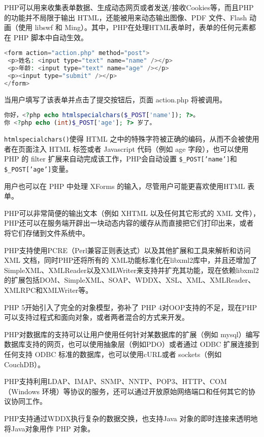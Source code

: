 PHP可以用来收集表单数据、生成动态网页或者发送/接收Cookies等，而且PHP的功能并不局限于输出 HTML，还能被用来动态输出图像、PDF 文件、Flash 动画（使用 libswf 和 Ming）。其中，PHP在处理HTML表单时，表单的任何元素都在 PHP 脚本中自动生效。

\begin{lstlisting}[language=PHP]
<form action="action.php" method="post">
 <p>姓名: <input type="text" name="name" /></p>
 <p>年龄: <input type="text" name="age" /></p>
 <p><input type="submit" /></p>
</form>
\end{lstlisting}

当用户填写了该表单并点击了提交按钮后，页面 action.php 将被调用。


\begin{lstlisting}[language=PHP]
你好，<?php echo htmlspecialchars($_POST['name']); ?>。
你 <?php echo (int)$_POST['age']; ?> 岁了。
\end{lstlisting}

\texttt{htmlspecialchars()}使得 HTML 之中的特殊字符被正确的编码，从而不会被使用者在页面注入 HTML 标签或者 Javascript 代码（例如 age 字段），也可以使用 PHP 的 filter 扩展来自动完成该工作，PHP会自动设置 \texttt{\$\_POST['name']}和\texttt{\$\_POST['age']}变量。

用户也可以在 PHP 中处理 XForms 的输入，尽管用户可能更喜欢使用HTML 表单。

PHP可以非常简便的输出文本（例如 XHTML 以及任何其它形式的 XML 文件），PHP还可以在服务端开辟出一块动态内容的缓存从而直接把它们打印出来，或者将它们存储到文件系统中。

PHP支持使用PCRE（Perl兼容正则表达式）以及其他扩展和工具来解析和访问 XML 文档，同时PHP还将所有的 XML功能标准化在libxml2库中，并且还增加了SimpleXML、XMLReader以及XMLWriter来支持并扩充其功能，现在依赖libxml2的扩展包括DOM、SimpleXML、SOAP、WDDX、XSL、XML、XMLReader、XMLRPC和XMLWriter等。


PHP 5开始引入了完全的对象模型，弥补了 PHP 4对OOP支持的不足，现在PHP可以支持过程式和面向对象，或者两者混合的方式来开发。

PHP对数据库的支持可以让用户使用任何针对某数据库的扩展（例如 mysql）编写数据库支持的网页，也可以使用抽象层（例如PDO）或者通过 ODBC 扩展连接到任何支持 ODBC 标准的数据库，也可以使用cURL或者 sockets（例如 CouchDB）。



PHP支持利用LDAP、IMAP、SNMP、NNTP、POP3、HTTP、COM（Windows 环境）等协议的服务，还可以通过开放原始网络端口和任何其它的协议协同工作。

PHP支持通过WDDX执行复杂的数据交换，也支持Java 对象的即时连接来透明地将Java对象用作 PHP 对象。



